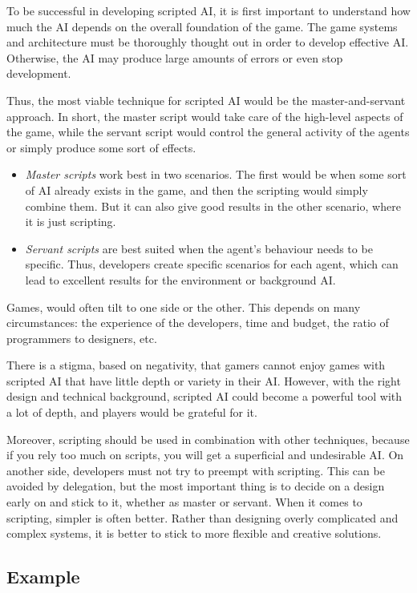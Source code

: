 \documentclass[a4paper,12pt,openright]{book}
\begin{document}
To be successful in developing scripted AI, it is first important to understand how much the AI depends on the overall foundation of the game. The game systems and architecture must be thoroughly thought out in order to develop effective AI. Otherwise, the AI may produce large amounts of errors or even stop development.

Thus, the most viable technique for scripted AI would be the master-and-servant approach. In short, the master script would take care of the high-level aspects of the game, while the servant script would control the general activity of the agents or simply produce some sort of effects. 

\begin{itemize} \item \emph{Master scripts} work best in two scenarios. The first would be when some sort of AI already exists in the game, and then the scripting would simply combine them. But it can also give good results in the other scenario, where it is just scripting. \item \emph{Servant scripts} are best suited when the agent's behaviour needs to be specific. Thus, developers create specific scenarios for each agent, which can lead to excellent results for the environment or background AI.
\end{itemize}

Games, would often tilt to one side or the other. This depends on many circumstances: the experience of the developers, time and budget, the ratio of programmers to designers, etc.

There is a stigma, based on negativity, that gamers cannot enjoy games with scripted AI that have little depth or variety in their AI. However, with the right design and technical background, scripted AI could become a powerful tool with a lot of depth, and players would be grateful for it.

Moreover, scripting should be used in combination with other techniques, because if you rely too much on scripts, you will get a superficial and undesirable AI. On another side, developers must not try to preempt with scripting. This can be avoided by delegation, but the most important thing is to decide on a design early on and stick to it, whether as master or servant. When it comes to scripting, simpler is often better. Rather than designing overly complicated and complex systems, it is better to stick to more flexible and creative solutions.

\subsection{Example}
\end{document}

